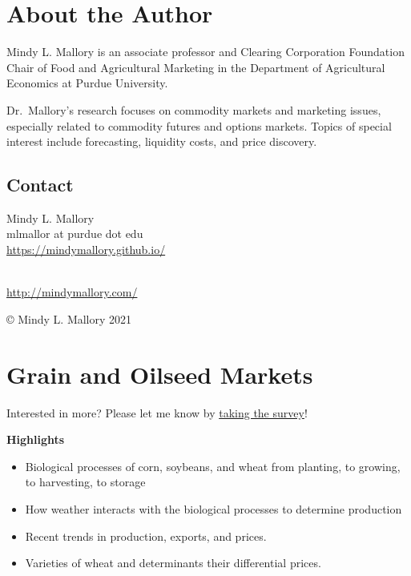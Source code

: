 \documentclass[
  letterpaper,
  DIV=11,
  numbers=noendperiod]{scrreprt}
\providecommand{\tightlist}{%
  \setlength{\itemsep}{0pt}\setlength{\parskip}{0pt}}\usepackage{longtable,booktabs,array}
\begin{document}

\chapter*{About the Author}\label{about-the-author}


Mindy L. Mallory is an associate professor and Clearing Corporation
Foundation Chair of Food and Agricultural Marketing in the Department of
Agricultural Economics at Purdue University.

Dr.~Mallory's research focuses on commodity markets and marketing
issues, especially related to commodity futures and options markets.
Topics of special interest include forecasting, liquidity costs, and
price discovery.

\section*{Contact}\label{contact}


Mindy L. Mallory\\
mlmallor at purdue dot edu\\
\url{https://mindymallory.github.io/}\strut \\
\url{http://mindymallory.com/}

© Mindy L. Mallory 2021


\chapter{Grain and Oilseed Markets}\label{grain-and-oilseed-markets}

{Interested in more? Please let me know by}
\href{https://forms.gle/Q3VByCQZHjfQSy9D7}{taking the survey}!

\textbf{Highlights}

\begin{itemize}
\tightlist
\item
  Biological processes of corn, soybeans, and wheat from planting, to
  growing, to harvesting, to storage
\item
  How weather interacts with the biological processes to determine
  production
\item
  Recent trends in production, exports, and prices.
\item
  Varieties of wheat and determinants their differential prices.
\end{itemize}
\end{document}

